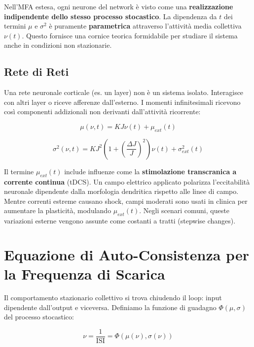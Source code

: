 Nell'MFA estesa, ogni neurone del network è visto come una \textbf{realizzazione indipendente dello stesso processo stocastico}. La dipendenza da $t$ dei termini $\mu$ e $\sigma^2$ è puramente \textbf{parametrica} attraverso l'attività media collettiva $\nu(t)$. Questo fornisce una cornice teorica formidabile per studiare il sistema anche in condizioni non stazionarie.

\subsection{Rete di Reti}

Una rete neuronale corticale (es. un layer) non è un sistema isolato. Interagisce con altri layer o riceve afferenze dall'esterno. I momenti infinitesimali ricevono così componenti addizionali non derivanti dall'attività ricorrente:

\begin{equation}
\mu(\nu, t) = K J \nu(t) + \mu_{ext}(t)
\end{equation}

\begin{equation}
\sigma^2(\nu, t) = K J^2 \left( 1 + \left(\frac{\Delta J}{J}\right)^2 \right) \nu(t) + \sigma_{ext}^2(t)
\end{equation}

Il termine $\mu_{ext}(t)$ include influenze come la \textbf{stimolazione transcranica a corrente continua} (tDCS). Un campo elettrico applicato polarizza l'eccitabilità neuronale dipendente dalla morfologia dendritica rispetto alle linee di campo. Mentre correnti estreme causano shock, campi moderati sono usati in clinica per aumentare la plasticità, modulando $\mu_{ext}(t)$. Negli scenari comuni, queste variazioni esterne vengono assunte come costanti a tratti (stepwise changes).

\section{Equazione di Auto-Consistenza per la Frequenza di Scarica}

Il comportamento stazionario collettivo si trova chiudendo il loop: input dipendente dall'output e viceversa. Definiamo la funzione di guadagno $\Phi(\mu, \sigma)$ del processo stocastico:

\begin{equation}
\nu = \frac{1}{\text{ISI}} = \Phi(\mu(\nu), \sigma(\nu))
\end{equation}

